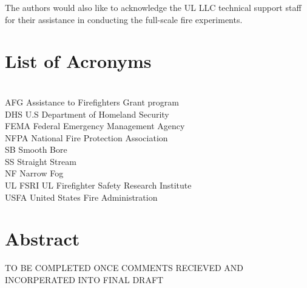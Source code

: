 \documentclass[12pt,oneside]{book}
\begin{document}
The authors would also like to acknowledge the UL LLC technical support staff for their assistance in conducting the full-scale fire experiments.

\cleardoublepage
{}
{}
\tableofcontents

\cleardoublepage
{}
{}
\listoffigures

\cleardoublepage
{}
{}
\listoftables

\chapter{List of Acronyms}

\begin{tabbing}
\hspace{1.5in} \= \\
AFG \> Assistance to Firefighters Grant program  \\
DHS \> U.S Department of Homeland Security   \\   
FEMA \> Federal Emergency Management Agency  \\
NFPA \> National Fire Protection Association \\
SB \> Smooth Bore \\
SS \> Straight Stream \\
NF \> Narrow Fog \\
UL FSRI \> UL Firefighter Safety Research Institute \\
USFA \> United States Fire Administration  \\
\end{tabbing}

\newpage

\mainmatter

\chapter*{Abstract}

TO BE COMPLETED ONCE COMMENTS RECIEVED AND INCORPERATED INTO FINAL DRAFT

\end{document}
